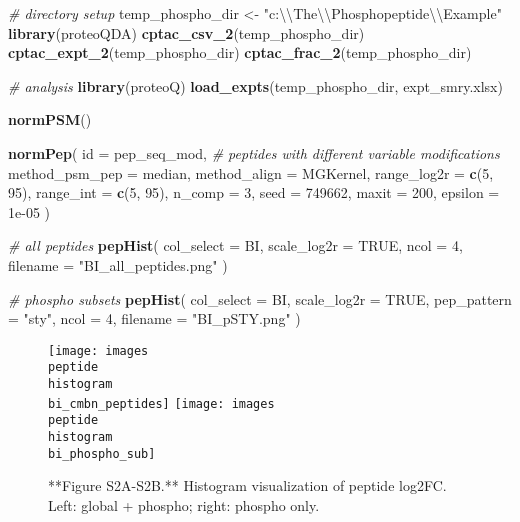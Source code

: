 \documentclass[]{article}
\newenvironment{Shaded}{\begin{snugshade}}{\end{snugshade}}
\newcommand{\CharTok}[1]{\textcolor[rgb]{0.31,0.60,0.02}{#1}}
\newcommand{\CommentTok}[1]{\textcolor[rgb]{0.56,0.35,0.01}{\textit{#1}}}
\newcommand{\DataTypeTok}[1]{\textcolor[rgb]{0.13,0.29,0.53}{#1}}
\newcommand{\DecValTok}[1]{\textcolor[rgb]{0.00,0.00,0.81}{#1}}
\newcommand{\FloatTok}[1]{\textcolor[rgb]{0.00,0.00,0.81}{#1}}
\newcommand{\KeywordTok}[1]{\textcolor[rgb]{0.13,0.29,0.53}{\textbf{#1}}}
\newcommand{\NormalTok}[1]{#1}
\newcommand{\OtherTok}[1]{\textcolor[rgb]{0.56,0.35,0.01}{#1}}
\newcommand{\StringTok}[1]{\textcolor[rgb]{0.31,0.60,0.02}{#1}}
\begin{document}
\begin{Shaded}
\begin{Highlighting}[]
\CommentTok{# directory setup}
\NormalTok{temp_phospho_dir <-}\StringTok{ "c:}\CharTok{\textbackslash{}\textbackslash{}}\StringTok{The}\CharTok{\textbackslash{}\textbackslash{}}\StringTok{Phosphopeptide}\CharTok{\textbackslash{}\textbackslash{}}\StringTok{Example"}
\KeywordTok{library}\NormalTok{(proteoQDA)}
\KeywordTok{cptac_csv_2}\NormalTok{(temp_phospho_dir)}
\KeywordTok{cptac_expt_2}\NormalTok{(temp_phospho_dir)}
\KeywordTok{cptac_frac_2}\NormalTok{(temp_phospho_dir)}

\CommentTok{# analysis}
\KeywordTok{library}\NormalTok{(proteoQ)}
\KeywordTok{load_expts}\NormalTok{(temp_phospho_dir, expt_smry.xlsx)}

\KeywordTok{normPSM}\NormalTok{()}

\KeywordTok{normPep}\NormalTok{(}
  \DataTypeTok{id =}\NormalTok{ pep_seq_mod, }\CommentTok{# peptides with different variable modifications}
  \DataTypeTok{method_psm_pep =}\NormalTok{ median, }
  \DataTypeTok{method_align =}\NormalTok{ MGKernel, }
  \DataTypeTok{range_log2r =} \KeywordTok{c}\NormalTok{(}\DecValTok{5}\NormalTok{, }\DecValTok{95}\NormalTok{), }
  \DataTypeTok{range_int =} \KeywordTok{c}\NormalTok{(}\DecValTok{5}\NormalTok{, }\DecValTok{95}\NormalTok{), }
  \DataTypeTok{n_comp =} \DecValTok{3}\NormalTok{, }
  \DataTypeTok{seed =} \DecValTok{749662}\NormalTok{, }
  \DataTypeTok{maxit =} \DecValTok{200}\NormalTok{, }
  \DataTypeTok{epsilon =} \FloatTok{1e-05}
\NormalTok{)}

\CommentTok{# all peptides}
\KeywordTok{pepHist}\NormalTok{(}
    \DataTypeTok{col_select =}\NormalTok{ BI, }
    \DataTypeTok{scale_log2r =} \OtherTok{TRUE}\NormalTok{, }
    \DataTypeTok{ncol =} \DecValTok{4}\NormalTok{, }
    \DataTypeTok{filename =} \StringTok{"BI_all_peptides.png"}
\NormalTok{)}

\CommentTok{# phospho subsets}
\KeywordTok{pepHist}\NormalTok{(}
    \DataTypeTok{col_select =}\NormalTok{ BI, }
    \DataTypeTok{scale_log2r =} \OtherTok{TRUE}\NormalTok{, }
    \DataTypeTok{pep_pattern =} \StringTok{"sty"}\NormalTok{, }
    \DataTypeTok{ncol =} \DecValTok{4}\NormalTok{, }
    \DataTypeTok{filename =} \StringTok{"BI_pSTY.png"}
\NormalTok{)}
\end{Highlighting}
\end{Shaded}

\begin{figure}

\texttt{[image: images\\peptide\\histogram\\bi\_cmbn\_peptides]} \texttt{[image: images\\peptide\\histogram\\bi\_phospho\_sub]} \hfill{}

\caption{**Figure S2A-S2B.** Histogram visualization of peptide log2FC. Left: global + phospho; right: phospho only.}\label{fig:peptide_subset_hist}
\end{figure}
\end{document}
